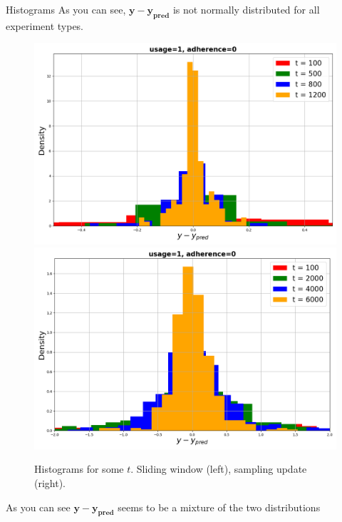 \documentclass[aspectratio=169]{beamer}
\begin{document}
    \begin{frame}{Histograms}
        \small
        As you can see, $\mathbf{y} - \mathbf{y_{\text{pred}}}$ is not normally distributed for all experiment types. 
        
        \begin{figure}[h!]
            \centering
            \includegraphics[width=0.45\linewidth]{pictures/hist_loop_1_0.png}
            \includegraphics[width=0.45\linewidth]{pictures/hist_sample_1_0.png}
            
            \caption{Histograms for some $t$. Sliding window (left), sampling update (right).}
            \label{hist}
        \end{figure}

        As you can see $\mathbf{y} - \mathbf{y_{\text{pred}}}$ seems to be a mixture of the two distributions
    \end{frame}
\end{document}
